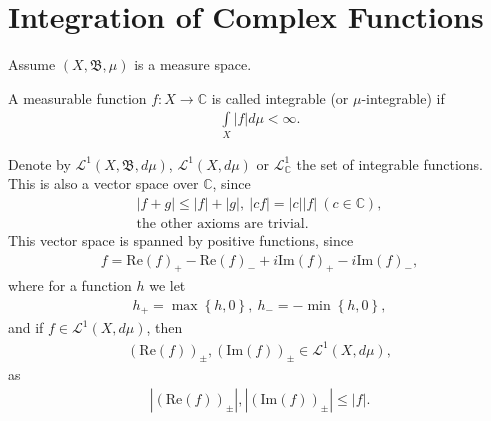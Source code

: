 \section{Integration of Complex Functions}
Assume \((X, \mathfrak{B}, \mu)\) is a measure space.
\begin{definition}
    A measurable function \(f:X\rightarrow \mathbb{C}\) is called integrable (or $\mu$-integrable) if
    \begin{align*}
        \int\limits_{X}|f|d\mu < \infty.
    \end{align*}
\end{definition}
Denote by \(\mathcal{L}^1(X, \mathfrak{B}, d\mu)\), \(\mathcal{L}^1(X, d\mu)\) or \(\mathcal{L}_{\mathbb{C}}^{1}\) the set of integrable
functions. This is also a vector space over $\mathbb{C}$, since
\begin{align*}
    |f + g| \leq |f| + |g|, \ |cf| = |c||f| \ (c\in \mathbb{C}), \\
    \text{the other axioms are trivial}.
\end{align*}
This vector space is spanned by positive functions, since
\begin{align*}
    f = \text{Re}(f)_{+} - \text{Re}(f)_{-} + i\text{Im}(f)_{+} - i\text{Im}(f)_{-},
\end{align*}
where for a function $h$ we let
\begin{align*}
    h_{+} = \max\left\{h,0\right\}, \ h_{-} = -\min\left\{ h,0 \right\},
\end{align*}
and if \(f\in \mathcal{L}^{1}(X, d\mu)\), then
\begin{align*}
    (\text{Re}(f))_{\pm}, (\text{Im}(f))_{\pm} \in \mathcal{L}^{1}(X, d\mu),
\end{align*}
as
\begin{align*}
    |(\text{Re}(f))_{\pm}|, |(\text{Im}(f))_{\pm}| \leq |f|.
\end{align*}

